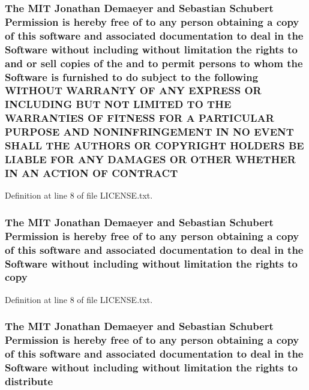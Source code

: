 \subsubsection[{\texorpdfstring{C\+O\+N\+T\+R\+A\+CT}{CONTRACT}}]{\setlength{\rightskip}{0pt plus 5cm}The M\+IT Jonathan Demaeyer and Sebastian Schubert Permission is hereby free of to any person obtaining a {\bf copy} of this software and associated documentation to deal in the {\bf Software} without including without limitation the rights to and or sell copies of the and to permit persons to whom the {\bf Software} is furnished to do subject to the following W\+I\+T\+H\+O\+UT W\+A\+R\+R\+A\+N\+TY OF A\+NY E\+X\+P\+R\+E\+SS OR I\+N\+C\+L\+U\+D\+I\+NG B\+UT N\+OT L\+I\+M\+I\+T\+ED TO T\+HE W\+A\+R\+R\+A\+N\+T\+I\+ES OF F\+I\+T\+N\+E\+SS F\+OR A P\+A\+R\+T\+I\+C\+U\+L\+AR P\+U\+R\+P\+O\+SE A\+ND N\+O\+N\+I\+N\+F\+R\+I\+N\+G\+E\+M\+E\+NT IN NO E\+V\+E\+NT S\+H\+A\+LL T\+HE A\+U\+T\+H\+O\+RS OR C\+O\+P\+Y\+R\+I\+G\+HT H\+O\+L\+D\+E\+RS BE L\+I\+A\+B\+LE F\+OR A\+NY D\+A\+M\+A\+G\+ES OR O\+T\+H\+ER W\+H\+E\+T\+H\+ER IN AN A\+C\+T\+I\+ON OF C\+O\+N\+T\+R\+A\+CT}\hypertarget{LICENSE_8txt_a5b4156ad0b4190af85988fa2674b4928}{}\label{LICENSE_8txt_a5b4156ad0b4190af85988fa2674b4928}


Definition at line 8 of file L\+I\+C\+E\+N\+S\+E.\+txt.

\subsubsection[{\texorpdfstring{copy}{copy}}]{\setlength{\rightskip}{0pt plus 5cm}The M\+IT Jonathan Demaeyer and Sebastian Schubert Permission is hereby free of to any person obtaining a copy of this software and associated documentation to deal in the {\bf Software} without including without limitation the rights to copy}\hypertarget{LICENSE_8txt_a51c339ce34cc545067d7d7c01c627159}{}\label{LICENSE_8txt_a51c339ce34cc545067d7d7c01c627159}


Definition at line 8 of file L\+I\+C\+E\+N\+S\+E.\+txt.

\subsubsection[{\texorpdfstring{distribute}{distribute}}]{\setlength{\rightskip}{0pt plus 5cm}The M\+IT Jonathan Demaeyer and Sebastian Schubert Permission is hereby free of to any person obtaining a {\bf copy} of this software and associated documentation to deal in the {\bf Software} without including without limitation the rights to distribute}\hypertarget{LICENSE_8txt_affbfb11626af26170017dc3174749a7b}{}\label{LICENSE_8txt_affbfb11626af26170017dc3174749a7b}


